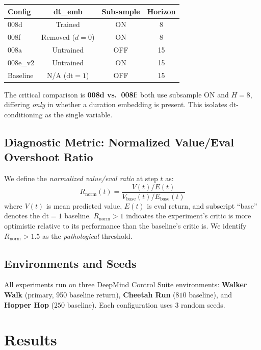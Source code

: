 \documentclass[10pt,letterpaper]{article}
\begin{document}
\begin{center}
\begin{tabular}{lccc}
\toprule
\textbf{Config} & \textbf{dt\_emb} & \textbf{Subsample} & \textbf{Horizon} \\
\midrule
008d & Trained & ON & 8 \\
008f & Removed ($d{=}0$) & ON & 8 \\
008a & Untrained & OFF & 15 \\
008e\_v2 & Untrained & ON & 15 \\
Baseline & N/A ($\mathrm{dt}{=}1$) & OFF & 15 \\
\bottomrule
\end{tabular}
\end{center}

The critical comparison is \textbf{008d vs.\ 008f}: both use subsample ON and $H{=}8$, differing \emph{only} in whether a duration embedding is present. This isolates $\mathrm{dt}$-conditioning as the single variable.

\subsection{Diagnostic Metric: Normalized Value/Eval Overshoot Ratio}

We define the \emph{normalized value/eval ratio} at step $t$ as:
\begin{equation}
    R_{\text{norm}}(t) = \frac{V(t) / E(t)}{V_{\text{base}}(t) / E_{\text{base}}(t)}
\end{equation}
where $V(t)$ is mean predicted value, $E(t)$ is eval return, and subscript ``base'' denotes the $\mathrm{dt}{=}1$ baseline. $R_{\text{norm}} > 1$ indicates the experiment's critic is more optimistic relative to its performance than the baseline's critic is. We identify $R_{\text{norm}} > 1.5$ as the \emph{pathological} threshold.

\subsection{Environments and Seeds}

All experiments run on three DeepMind Control Suite environments: \textbf{Walker Walk} (primary, 950 baseline return), \textbf{Cheetah Run} ($810$ baseline), and \textbf{Hopper Hop} ($250$ baseline). Each configuration uses 3 random seeds.


\section{Results}
\label{sec:results}
\end{document}
